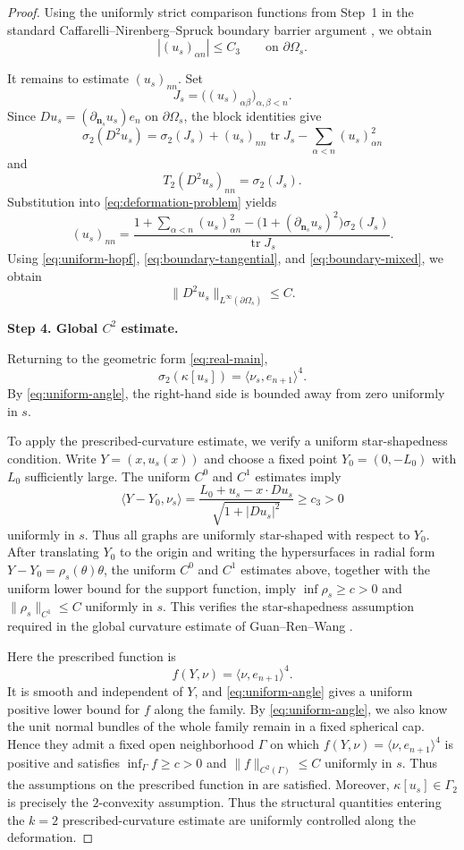 \documentclass{article}
\numberwithin{equation}{section}
\begin{document}
\begin{proof}
Using the uniformly strict comparison functions from Step~1 in the
standard Caffarelli--Nirenberg--Spruck boundary barrier argument
\cite{CNS88}, we obtain
\begin{equation}\label{eq:boundary-mixed}
|(u_s)_{\alpha n}|\le C_3
\qquad\text{on }\partial\Omega_s.
\end{equation}

It remains to estimate $(u_s)_{nn}$. Set
\[
J_s=
\bigl((u_s)_{\alpha\beta}\bigr)_{\alpha,\beta<n}.
\]
Since $Du_s=(\partial_{\mathbf n_s}u_s)e_n$ on $\partial\Omega_s$,
the block identities give
\[
\sigma_2(D^2u_s)
=
\sigma_2(J_s)
+
(u_s)_{nn}\operatorname{tr}J_s
-
\sum_{\alpha<n}(u_s)_{\alpha n}^2
\]
and
\[
T_2(D^2u_s)_{nn}=\sigma_2(J_s).
\]
Substitution into \eqref{eq:deformation-problem} yields
\[
(u_s)_{nn}
=
\frac{
1+\displaystyle\sum_{\alpha<n}(u_s)_{\alpha n}^2
-
\bigl(1+(\partial_{\mathbf n_s}u_s)^2\bigr)\sigma_2(J_s)
}{
\operatorname{tr}J_s
}.
\]
Using \eqref{eq:uniform-hopf},
\eqref{eq:boundary-tangential}, and
\eqref{eq:boundary-mixed}, we obtain
\begin{equation}\label{eq:boundary-c2}
\|D^2u_s\|_{L^\infty(\partial\Omega_s)}\le C.
\end{equation}

\medskip
\noindent\textbf{Step 4. Global $C^2$ estimate.}

Returning to the geometric form \eqref{eq:real-main},
\[
\sigma_2(\kappa[u_s])
=
\langle\nu_s,e_{n+1}\rangle^4.
\]
By \eqref{eq:uniform-angle}, the right-hand side is bounded away from
zero uniformly in $s$.

To apply the prescribed-curvature estimate, we verify a uniform
star-shapedness condition. Write $Y=(x,u_s(x))$ and choose a fixed
point $Y_0=(0,-L_0)$ with $L_0$ sufficiently large. The uniform
$C^0$ and $C^1$ estimates imply
\[
\langle Y-Y_0,\nu_s\rangle
=
\frac{L_0+u_s-x\cdot Du_s}
{\sqrt{1+|Du_s|^2}}
\ge c_3>0
\]
uniformly in $s$. Thus all graphs are uniformly star-shaped with
respect to $Y_0$.  After translating $Y_0$ to the origin and writing the hypersurfaces
in radial form $Y-Y_0=\rho_s(\theta)\theta$, the uniform $C^0$ and
$C^1$ estimates above, together with the uniform lower bound for the
support function, imply
$\inf \rho_s\ge c>0$ and $\|\rho_s\|_{C^1}\le C$ uniformly in $s$. This verifies the star-shapedness
assumption required in the global curvature estimate of
Guan--Ren--Wang \cite{GRW15}.

Here the prescribed function is
\[
f(Y,\nu)=\langle \nu,e_{n+1}\rangle^4.
\]
It is smooth and independent of $Y$, and
\eqref{eq:uniform-angle} gives a uniform positive lower bound for
$f$ along the family. By \eqref{eq:uniform-angle}, we also know the unit normal bundles of the whole family remain in a
fixed spherical cap. Hence they admit a fixed open neighborhood
$\Gamma$ on which
$f(Y,\nu)=\langle\nu,e_{n+1}\rangle^4$ is positive and satisfies
$\inf_{\Gamma}f\ge c>0$ and $\|f\|_{C^2(\Gamma)}\le C$ uniformly in
$s$. Thus the assumptions on the prescribed function in
\cite{GRW15} are satisfied. Moreover,
$\kappa[u_s]\in\Gamma_2$ is precisely the $2$-convexity
assumption. Thus the structural quantities entering the
$k=2$ prescribed-curvature estimate are uniformly controlled
along the deformation.


\end{proof}
\end{document}
